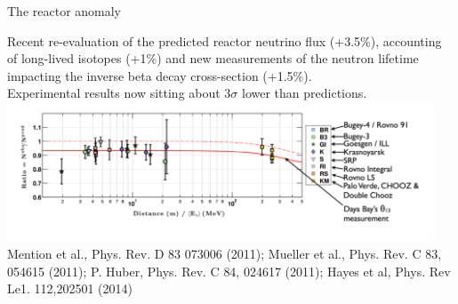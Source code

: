 %
%
%

\begin{frame}[t]{The reactor anomaly}

Recent re-evaluation of the predicted reactor neutrino flux (+3.5\%), accounting of long-lived isotopes (+1\%)
and new measurements of  the neutron lifetime impacting the inverse beta decay cross-section (+1.5\%).\\
\vspace{0.3cm}
Experimental results now sitting about 3$\sigma$ lower than predictions.\\
\vspace{0.2cm}
\includegraphics[width=0.95\textwidth]{./images/beyond3nu/reactor/deficit2.png}\\
{\scriptsize \color{blue}
 Mention et al., Phys. Rev. D 83 073006 (2011);
 Mueller et al., Phys. Rev. C 83, 054615 (2011);
 P. Huber, Phys. Rev. C 84, 024617 (2011);
 Hayes et al, Phys. Rev Le1. 112,202501 (2014)
}

\end{frame}

%
%
%

